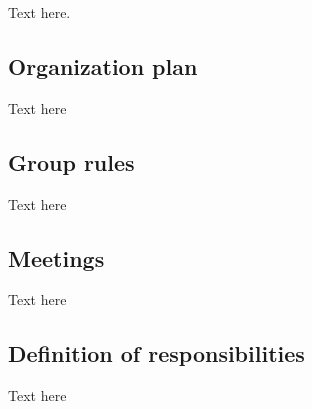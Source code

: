 Text here.


\subsection{Organization plan}
Text here

\subsection{Group rules}
Text here

\subsection{Meetings}
Text here

\subsection{Definition of responsibilities}
Text here

